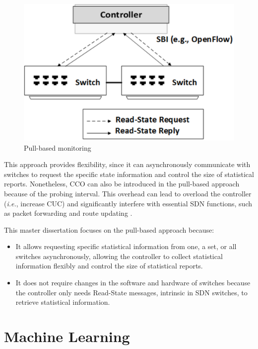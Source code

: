 \begin{itemize}
    \begin{figure}[!ht]
        \centering
        \includegraphics[scale=0.6]{figures/Pull-Based}
        \caption{Pull-based monitoring}
        \label{fig:pull-based}
    \end{figure}
       
    This approach provides flexibility, since it can asynchronously communicate with switches to request the specific state information and control the size of statistical reports. Nonetheless, CCO can also be introduced in the pull-based approach because of the probing interval. This overhead can lead to overload the controller (\textit{i.e.}, increase CUC) and significantly interfere with essential SDN functions, such as packet forwarding and route updating \cite{Malboubi_2015:SNIPER}.
\end{itemize}

This master dissertation focuses on the pull-based approach because:
\begin{itemize}
    \item It allows requesting specific statistical information from one, a set, or all switches asynchronously, allowing the controller to collect statistical information flexibly and control the size of statistical reports.
    \item It does not require changes in the software and hardware of switches because the controller only needs Read-State messages, intrinsic in SDN switches, to retrieve statistical information.
\end{itemize}

\section{Machine Learning}
\label{sec:background-ml}

